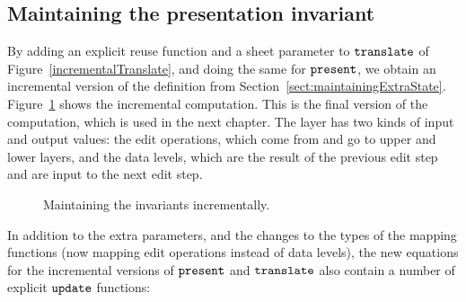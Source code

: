 %																
\subsection{Maintaining the presentation invariant}

By adding an explicit reuse function and a sheet parameter to ${\tt translate}$ of Figure~\ref{incrementalTranslate}, and doing the same for ${\tt present}$, we obtain an incremental version of the definition from Section~\ref{sect:maintainingExtraState}. Figure~\ref{layerExtraStateInc} shows the incremental computation. This is the final version of the computation, which is used in the next chapter. The layer has two kinds of input and output values: the edit operations, which come from and go to upper and lower layers, and the data levels, which are the result of the previous edit step and are input to the next edit step.

\begin{figure}
\begin{center}
\begin{center}
\end{center}
\caption{Maintaining the invariants incrementally.}\label{layerExtraStateInc} 
\end{center}
\end{figure}

In addition to the extra parameters, and the changes to the types of the mapping functions (now mapping edit operations instead of data levels),  the new equations for the incremental versions of ${\tt present}$ and 
${\tt translate}$ also contain a number of explicit  ${\tt update}$ functions: 

